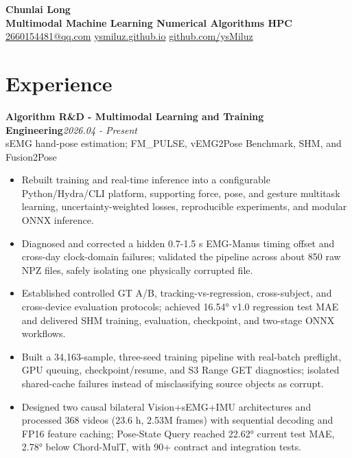 \documentclass[10pt,letterpaper]{article}
\newcommand{\entry}[3]{%
  \textbf{#1}\hfill{\color{muted}\textit{#2}}\\[-0.22em]
  {\color{muted}\small #3}\par
}
\begin{document}
\fontsize{10.5}{12.6}\selectfont
\begin{center}
  {\fontsize{22}{24}\selectfont\bfseries Chunlai Long}\\[0.12em]
  {\color{accent}\bfseries Multimodal Machine Learning \textbar{} Numerical Algorithms \textbar{} HPC}\\[0.16em]
  \href{mailto:2660154481@qq.com}{2660154481@qq.com}
  \quad\textbar\quad
  \href{https://ysmiluz.github.io}{ysmiluz.github.io}
  \quad\textbar\quad
  \href{https://github.com/ysMiluz}{github.com/ysMiluz}
\end{center}
\vspace{-0.62em}

\section{Experience}

\entry{Algorithm R\&D - Multimodal Learning and Training Engineering}{2026.04 - Present}{sEMG hand-pose estimation; FM\_PULSE, vEMG2Pose Benchmark, SHM, and Fusion2Pose}
\begin{itemize}
  \item Rebuilt training and real-time inference into a configurable Python/Hydra/CLI platform, supporting force, pose, and gesture multitask learning, uncertainty-weighted losses, reproducible experiments, and modular ONNX inference.
  \item Diagnosed and corrected a hidden 0.7-1.5 s EMG-Manus timing offset and cross-day clock-domain failures; validated the pipeline across about 850 raw NPZ files, safely isolating one physically corrupted file.
  \item Established controlled GT A/B, tracking-vs-regression, cross-subject, and cross-device evaluation protocols; achieved 16.54° v1.0 regression test MAE and delivered SHM training, evaluation, checkpoint, and two-stage ONNX workflows.
  \item Built a 34,163-sample, three-seed training pipeline with real-batch preflight, GPU queuing, checkpoint/resume, and S3 Range GET diagnostics; isolated shared-cache failures instead of misclassifying source objects as corrupt.
  \item Designed two causal bilateral Vision+sEMG+IMU architectures and processed 368 videos (23.6 h, 2.53M frames) with sequential decoding and FP16 feature caching; Pose-State Query reached 22.62° current test MAE, 2.78° below Chord-MulT, with 90+ contract and integration tests.
\end{itemize}
\end{document}
